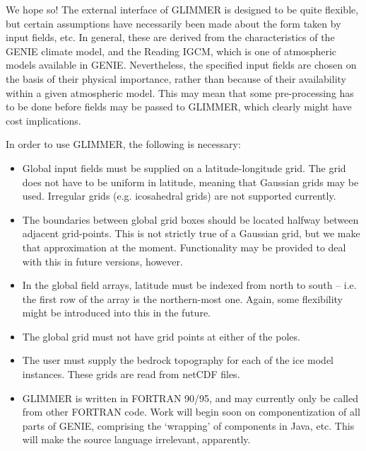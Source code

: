 We hope so! The external interface of GLIMMER is designed to be quite
flexible, but certain assumptions have necessarily been made about the form
taken by input fields, etc. In general, these are derived from the
characteristics of the GENIE climate model, and the Reading IGCM, which is one
of atmospheric models available in GENIE. Nevertheless, the specified input
fields are chosen on the basis of their physical importance, rather than
because of their availability within a given atmospheric model. This may mean
that some pre-processing has to be done before fields may be passed to
GLIMMER, which clearly might have cost implications.

In order to use GLIMMER, the following is necessary:

\begin{itemize}
\item Global input fields must be supplied on a latitude-longitude
  grid. The grid does not have to be uniform in latitude, meaning that
  Gaussian grids may be used. Irregular grids (e.g. icosahedral grids) are not
  supported currently. 
\item The boundaries between global grid boxes should be located halfway
  between adjacent grid-points. This is not strictly true of a Gaussian grid,
  but we make that approximation at the moment. Functionality may be provided
  to deal with this in future versions, however.
\item In the global field arrays, latitude must be indexed from north to south
  -- i.e. the first row of the array is the northern-most one. Again, some
  flexibility might be introduced into this in the future.
\item The global grid must not have grid points at either of the poles.
\item The user must supply the bedrock topography for each of the ice model
  instances. These grids are read from netCDF files.
\item GLIMMER is written in FORTRAN 90/95, and may currently only be called from
  other FORTRAN code. Work will begin soon on componentization of
  all parts of GENIE, comprising the `wrapping' of components in Java,
  etc. This will make the source language irrelevant, apparently.
\end{itemize}
